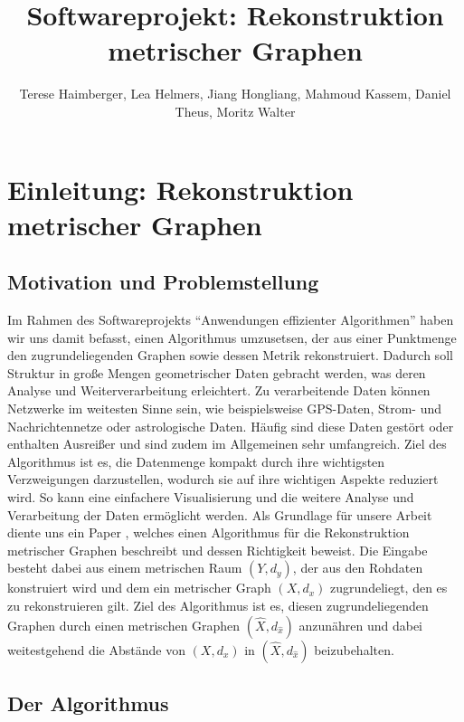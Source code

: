 \documentclass[parskip=half,
 fontsize=12pt, bibtotoc,
 ngerman]
 {article}
\author{Terese Haimberger, Lea Helmers, Jiang Hongliang, Mahmoud Kassem, Daniel Theus, Moritz Walter}
\title{Softwareprojekt: Rekonstruktion metrischer Graphen}
\date{}
\begin{document}
\maketitle
\tableofcontents
\newpage
\onehalfspacing
\section{Einleitung: Rekonstruktion metrischer Graphen}
\subsection*{Motivation und Problemstellung}
Im Rahmen des Softwareprojekts "`Anwendungen effizienter Algorithmen"' haben wir uns damit befasst, einen Algorithmus umzusetsen, der aus einer Punktmenge den zugrundeliegenden Graphen sowie dessen Metrik rekonstruiert. Dadurch soll Struktur in gro{\ss}e Mengen geometrischer Daten gebracht werden, was deren Analyse und Weiterverarbeitung erleichtert. Zu verarbeitende Daten können Netzwerke im weitesten Sinne sein, wie beispielsweise GPS-Daten, Strom- und Nachrichtennetze oder astrologische Daten. Häufig sind diese Daten gestört oder enthalten Ausreißer und sind zudem im Allgemeinen sehr umfangreich. Ziel des Algorithmus ist es, die Datenmenge kompakt durch ihre wichtigsten Verzweigungen darzustellen, wodurch sie auf ihre wichtigen Aspekte reduziert wird. So kann eine einfachere Visualisierung und die weitere Analyse und Verarbeitung der Daten ermöglicht werden.\newline
Als Grundlage für unsere Arbeit diente uns ein Paper \cite{chenEa2012}, welches einen Algorithmus für die Rekonstruktion metrischer Graphen beschreibt und dessen Richtigkeit beweist. Die Eingabe besteht dabei aus einem metrischen Raum $\left(Y, d_y\right)$, der aus den Rohdaten konstruiert wird und dem ein metrischer Graph $\left(X, d_x\right)$ zugrundeliegt, den es zu rekonstruieren gilt. Ziel des Algorithmus ist es, diesen zugrundeliegenden Graphen durch einen metrischen Graphen $(\hat{X}, d_{\hat{x}})$ anzunähren und dabei weitestgehend die Abstände von $\left(X, d_x\right)$ in $(\hat{X}, d_{\hat{x}})$ beizubehalten. \newline
\subsection*{Der Algorithmus}
\end{document}
